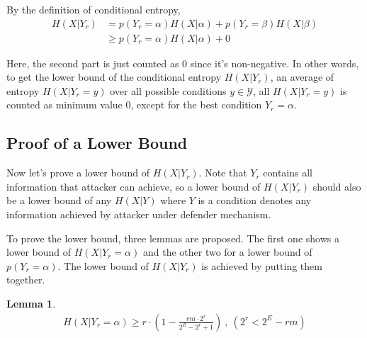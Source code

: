 \documentclass[10pt, conference, compsocconf]{IEEEtran}
\newtheorem{mylemma}{Lemma}
\begin{document}
        By the definition of conditional entropy,
        \begin{align*}
            H(X|Y_r) &= p(Y_r = \alpha) H(X | \alpha) + p(Y_r = \beta) H(X | \beta)\\
                &\geq p(Y_r = \alpha) H(X | \alpha) + 0
        \end{align*}
        
        Here, the second part is just counted as $0$ since it's non-negative.
        In other words, to get the lower bound of the conditional entropy $H(X | Y_r)$,
        an average of entropy $H(X | Y_r = y)$ over all possible conditions $y \in \mathcal Y$, 
        all $H(X | Y_r = y)$ is counted as minimum value $0$, except for the best condition
        $Y_r = \alpha$.

    \subsection{Proof of a Lower Bound}
    	Now let's prove a lower bound of $H(X | Y_r)$.
    	Note that $Y_r$ contains all information that attacker can achieve,
    	so a lower bound of $H(X | Y_r)$ should also be a lower
    	bound of any $H(X | Y)$ where $Y$ is a condition denotes any
    	information achieved by attacker under defender mechanism.
    	
        To prove the lower bound, three lemmas are proposed.
        The first one shows a lower bound of $H(X | Y_r = \alpha)$
        and the other two for a lower bound of $p(Y_r = \alpha)$.
        The lower bound of $H(X | Y_r)$ is achieved by putting
        them together.

        \begin{mylemma}\label{lem1}
        \begin{align*}
            H(X|Y_r = \alpha) \geq r \cdot (1-\frac{r m \cdot 2^r}{2^E-2^r+1}) ~,~(2^r < 2^E - r m)
        \end{align*}
        \end{mylemma}
\end{document}
